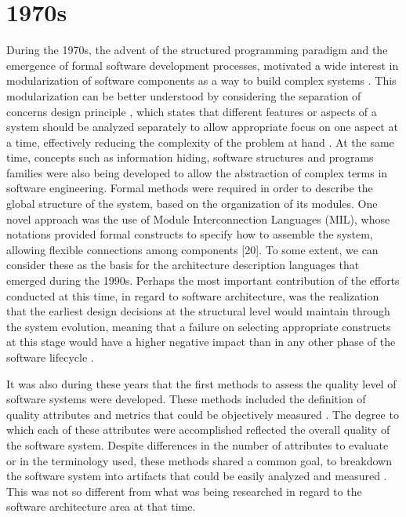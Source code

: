 \documentclass[10pt]{article}
\begin{document}
\section{1970s}

During the 1970s, the advent of the structured programming paradigm and the emergence of formal software development processes, motivated a wide interest in modularization of software components as a way to build complex systems \cite{Parnas72}. This modularization can be better understood by considering the separation of concerns design principle \cite{Dijkstra82}, which states that different features or aspects of a system should be analyzed separately to allow appropriate focus on one aspect at a time, effectively reducing the complexity of the problem at hand \cite{Dijkstra82}. At the same time, concepts such as information hiding, software structures and programs families were also being developed to allow the abstraction of complex terms in software engineering. Formal methods were required in order to describe the global structure of the system, based on the organization of its modules. One novel approach was the use of Module Interconnection Languages (MIL), whose notations provided formal constructs to specify how to assemble the system, allowing flexible connections among components [20]. To some extent, we can consider these as the basis for the architecture description languages that emerged during the 1990s. Perhaps the most important contribution of the efforts conducted at this time, in regard to software architecture, was the realization that the earliest design decisions at the structural level would maintain through the system evolution, meaning that a failure on selecting appropriate constructs at this stage would have a higher negative impact than in any other phase of the software lifecycle \cite{Parnas76}.

It was also during these years that the first methods to assess the quality level of software systems were developed. These methods included the definition of quality attributes and metrics that could be objectively measured \cite{Naik08}. The degree to which each of these attributes were accomplished reflected the overall quality of the software system. Despite differences in the number of attributes to evaluate or in the terminology used, these methods shared a common goal, to breakdown the software system into artifacts that could be easily analyzed and measured \cite{Naik08}. This was not so different from what was being researched in regard to the software architecture area at that time.
\end{document}
